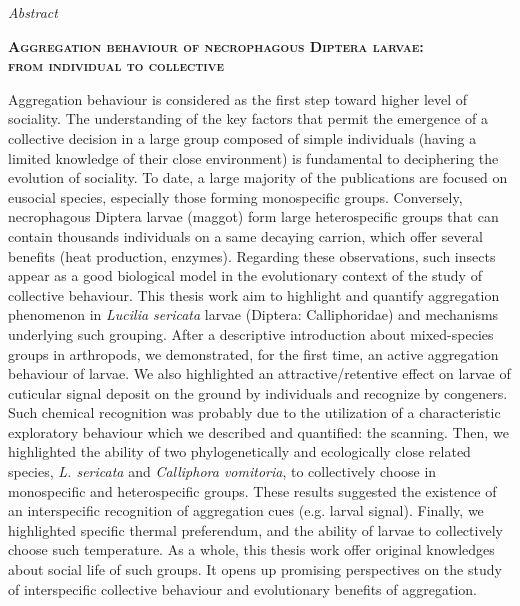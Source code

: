 \documentclass[11pt, oneside]{Thesis} %
\begin{document}
\clearpage %

\thispagestyle{empty}
  \null\vfil
	\begin{center}
		\setlength{\parskip}{0pt}
		{\huge{\textit{Abstract}} \par}
    	\bigskip
        {\textsc{\textbf{Aggregation behaviour of necrophagous Diptera larvae: \\from individual to collective}} \par} %
    	\medskip
	\end{center}

Aggregation behaviour is considered as the first step toward higher level of sociality. The understanding of the key factors that permit the emergence of a collective decision in a large group composed of simple individuals (having a limited knowledge of their close environment) is fundamental to deciphering the evolution of sociality. To date, a large majority of the publications are focused on eusocial species, especially those forming monospecific groups. Conversely, necrophagous Diptera larvae (maggot) form large heterospecific groups that can contain thousands individuals on a same decaying carrion, which offer several benefits (heat production, enzymes). Regarding these observations, such insects appear as a good biological model in the evolutionary context of the study of collective behaviour. This thesis work aim to highlight and quantify aggregation phenomenon in \textit{Lucilia sericata} larvae (Diptera: Calliphoridae) and mechanisms underlying such grouping. After a descriptive introduction about mixed-species groups in arthropods, we demonstrated, for the first time, an active aggregation behaviour of larvae. We also highlighted an attractive/retentive effect on larvae of cuticular signal deposit on the ground by individuals and recognize by congeners. Such chemical recognition was probably due to the utilization of a characteristic exploratory behaviour which we described and quantified: the scanning. Then, we highlighted the ability of two phylogenetically and ecologically close related species, \textit{L. sericata} and \textit{Calliphora vomitoria}, to collectively choose in monospecific and heterospecific groups. These results suggested the existence of an interspecific recognition of aggregation cues (e.g. larval signal). Finally, we highlighted specific thermal preferendum, and the ability of larvae to collectively choose such temperature. As a whole, this thesis work offer original knowledges about social life of such groups. It opens up promising perspectives on the study of interspecific collective behaviour and evolutionary benefits of aggregation.
\end{document}

